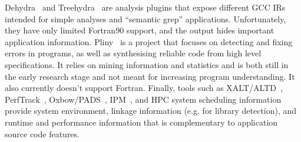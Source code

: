 Dehydra~\cite{dehydra} and Treehydra~\cite{treehydra} are analysis plugins that expose different \ac{GCC} \acp{IR} intended for simple analyses and ``semantic grep'' applications.
Unfortunately, they have only limited Fortran90 support, and the output hides important application information.
Pliny~\cite{Feser:2015} is a project that focuses on detecting and fixing errors in programs, as well as synthesising reliable code from high level specifications.
It relies on mining information and statistics and is both still in the early research stage and not meant for increasing program understanding.
It also currently doesn't support Fortran.
Finally, tools such as XALT/ALTD~\cite{xalt,xalt2}, PerfTrack~\cite{Karavanic:2005:IDT:1105760.1105804}, Oxbow/PADS~\cite{oxbowpads}, IPM~\cite{5695625}, and HPC system scheduling information provide system environment, linkage information (e.g. for library detection), and runtime and performance information that is complementary to application source code features.
